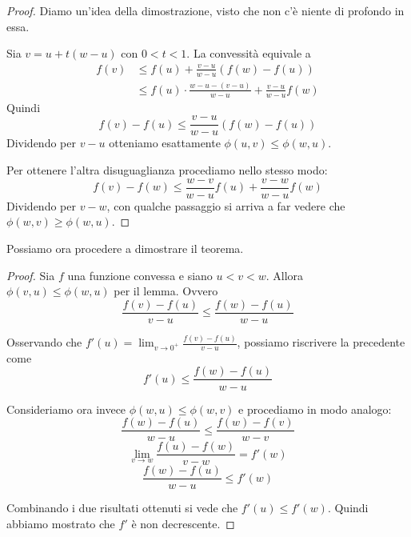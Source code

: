 \begin{proof}
Diamo un'idea della dimostrazione, visto che non c'è niente di profondo in essa.

Sia $v = u + t(w-u)$ con $0 < t < 1$. La convessità equivale a
\begin{align*}
f(v) &\le f(u) + \frac{v-u}{w-u} (f(w)-f(u)) \\
&\le f(u) \cdot \frac{w-u-(v-u)}{w-u} + \frac{v-u}{w-u} f(w)
\end{align*}
Quindi
\begin{equation*}
f(v)-f(u) \le \frac{v-u}{w-u} (f(w)-f(u))
\end{equation*}
Dividendo per $v-u$ otteniamo esattamente $\phi(u,v) \le \phi(w,u)$. 

Per ottenere l'altra disuguaglianza procediamo nello stesso modo:
\begin{equation*}
f(v)-f(w) \le \frac{w-v}{w-u}f(u) + \frac{v-w}{w-u}f(w)
\end{equation*}
Dividendo per $v-w$, con qualche passaggio si arriva a far vedere che $\phi(w,v) \ge \phi(w,u)$.
\end{proof}

Possiamo ora procedere a dimostrare il teorema.
\begin{proof}
Sia $f$ una funzione convessa e siano $u < v < w$. Allora $\phi(v,u) \le \phi(w,u)$ per il lemma. Ovvero
\begin{equation*}
\frac{f(v)-f(u)}{v-u} \le \frac{f(w)-f(u)}{w-u}
\end{equation*}

Osservando che $f'(u) = \lim_{v \to 0^+} \frac{f(v)-f(u)}{v-u}$, possiamo riscrivere la precedente come
\begin{equation*}
f'(u) \le \frac{f(w)-f(u)}{w-u}
\end{equation*}

Consideriamo ora invece $\phi(w,u) \le \phi(w,v)$ e procediamo in modo analogo:
\begin{equation*}
\frac{f(w)-f(u)}{w-u} \le \frac{f(w)-f(v)}{w-v}
\end{equation*}
\begin{equation*}
\lim_{v \to w} \frac{f(u)-f(w)}{v-w} = f'(w)
\end{equation*}
\begin{equation*}
\frac{f(w)-f(u)}{w-u} \le f'(w)
\end{equation*}

Combinando i due risultati ottenuti si vede che $f'(u) \le f'(w)$. Quindi abbiamo mostrato che $f'$ è non decrescente.
\end{proof}

